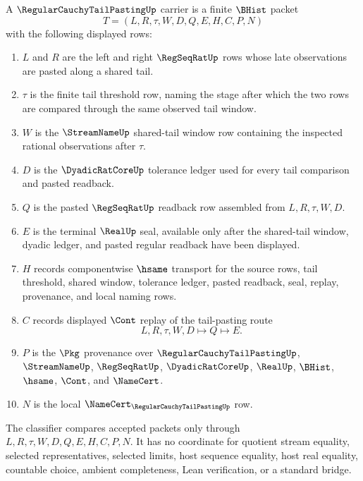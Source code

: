 \begin{definition}
\label{def:regular-cauchy-tail-pasting-carrier}
A $\RegularCauchyTailPastingUp$ carrier is a finite $\BHist$ packet
$$
T=(L,R,\tau,W,D,Q,E,H,C,P,N)
$$
with the following displayed rows:
\begin{enumerate}
\item $L$ and $R$ are the left and right $\RegSeqRatUp$ rows whose late observations are pasted along a shared tail.
\item $\tau$ is the finite tail threshold row, naming the stage after which the two rows are compared through the same observed tail window.
\item $W$ is the $\StreamNameUp$ shared-tail window row containing the inspected rational observations after $\tau$.
\item $D$ is the $\DyadicRatCoreUp$ tolerance ledger used for every tail comparison and pasted readback.
\item $Q$ is the pasted $\RegSeqRatUp$ readback row assembled from $L,R,\tau,W,D$.
\item $E$ is the terminal $\RealUp$ seal, available only after the shared-tail window, dyadic ledger, and pasted regular readback have been displayed.
\item $H$ records componentwise $\hsame$ transport for the source rows, tail threshold, shared window, tolerance ledger, pasted readback, seal, replay, provenance, and local naming rows.
\item $C$ records displayed $\Cont$ replay of the tail-pasting route
$$
L,R,\tau,W,D \longmapsto Q \longmapsto E .
$$
\item $P$ is the $\Pkg$ provenance over $\RegularCauchyTailPastingUp$, $\StreamNameUp$, $\RegSeqRatUp$, $\DyadicRatCoreUp$, $\RealUp$, $\BHist$, $\hsame$, $\Cont$, and $\NameCert$.
\item $N$ is the local $\NameCert_{\RegularCauchyTailPastingUp}$ row.
\end{enumerate}
The classifier compares accepted packets only through $L,R,\tau,W,D,Q,E,H,C,P,N$. It has no coordinate for quotient stream equality, selected representatives, selected limits, host sequence equality, host real equality, countable choice, ambient completeness, Lean verification, or a standard bridge.
\end{definition}

